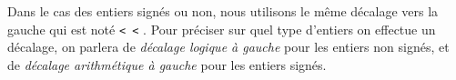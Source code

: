 Dans le cas des entiers signés ou non, nous utilisons le même décalage vers la gauche qui est noté \texttt{<\,\!<} .
Pour préciser sur quel type d'entiers on effectue un décalage, on parlera de \emph{\og décalage logique à gauche \fg} pour les entiers non signés,
et de \emph{\og décalage arithmétique à gauche \fg} pour les entiers signés.